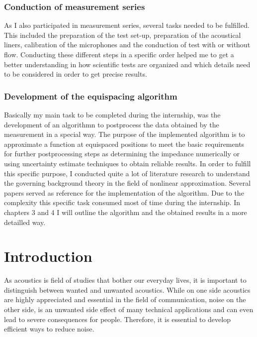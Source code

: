 \documentclass[11pt]{report} %
\begin{document}
\subsection{Conduction of measurement series}
As I also participated in measurement series, several tasks needed to be fulfilled.
This included the preparation of the test set-up, preparation of the acoustical liners, calibration of the microphones and the conduction of test with or without flow.
Conducting these different steps in a specific order helped me to get a better understanding in how scientific tests are organized and which details need to be considered in order to get precise results. 

\subsection{Development of the equispacing algorithm}
Basically my main task to be completed during the internship, was the development of an algorithmn to postprocess the data obtained by the measurement in a special way. 
The purpose of the implemented algorithm is to approximate a function at equispaced positions to meet the basic requirements for further postprocessing steps as determining the impedance numerically or using uncertainty estimate techniques to obtain reliable results.  
In order to fulfill this specific purpose, I conducted quite a lot of literature research to understand the governing background theory in the field of nonlinear approximation.
Several papers served as reference for the implementation of the algorithm. 
Due to the complexity this specific task consumed most of time during the internship.
In chapters 3 and 4 I will outline the algorithm and the obtained results in a more detailled way.
 
\chapter{Introduction} 
As acoustics is field of studies that bother our everyday lives, it is important to distinguish between wanted and unwanted acoustics.
While on one side acoustics are highly appreciated and essential in the field of communication, noise on the other side, is an unwanted side effect of many technical applications and can even lead to severe consequences for people.
Therefore, it is essential to develop efficient ways to reduce noise.
\end{document}
